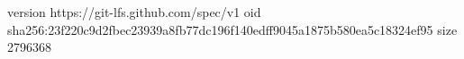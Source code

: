 version https://git-lfs.github.com/spec/v1
oid sha256:23f220c9d2fbec23939a8fb77dc196f140edff9045a1875b580ea5c18324ef95
size 2796368
